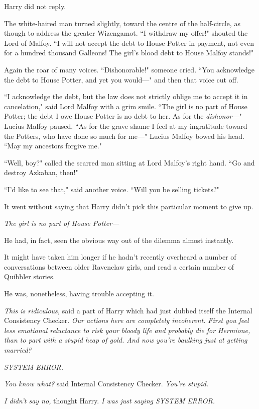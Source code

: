 Harry did not reply.

The white-haired man turned slightly, toward the centre of the half-circle, as though to address the greater Wizengamot. ``I withdraw my offer!" shouted the Lord of Malfoy. ``I will not accept the debt to House Potter in payment, not even for a hundred thousand Galleons! The girl's blood debt to House Malfoy stands!"

Again the roar of many voices. ``Dishonorable!" someone cried. ``You acknowledge the debt to House Potter, and yet you would—" and then that voice cut off.

``I acknowledge the debt, but the law does not strictly oblige me to accept it in cancelation," said Lord Malfoy with a grim smile. ``The girl is no part of House Potter; the debt I owe House Potter is no debt to her. As for the \emph{dishonor}—" Lucius Malfoy paused. ``As for the grave shame I feel at my ingratitude toward the Potters, who have done so much for me—" Lucius Malfoy bowed his head. ``May my ancestors forgive me."

``Well, boy?" called the scarred man sitting at Lord Malfoy's right hand. ``Go and destroy Azkaban, then!"

``I'd like to see that," said another voice. ``Will you be selling tickets?"

It went without saying that Harry didn't pick this particular moment to give up.

\emph{The girl is no part of House Potter—}

He had, in fact, seen the obvious way out of the dilemma almost instantly.

It might have taken him longer if he hadn't recently overheard a number of conversations between older Ravenclaw girls, and read a certain number of Quibbler stories.

He was, nonetheless, having trouble accepting it.

\emph{This is ridiculous,} said a part of Harry which had just dubbed itself the Internal Consistency Checker. \emph{Our actions here are completely incoherent. First you feel less emotional reluctance to risk your bloody \emph{life} and probably \emph{die} for Hermione, than to part with a stupid heap of gold. And now you're baulking just at getting married?}

\emph{SYSTEM ERROR.}

\emph{You know what?} said Internal Consistency Checker. \emph{You're stupid.}

\emph{I didn't say no,} thought Harry. \emph{I was just saying SYSTEM ERROR.}

